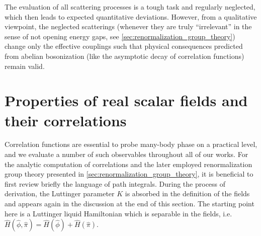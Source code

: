 The evaluation of all scattering processes is a tough task and regularly neglected, which then leads to expected quantitative deviations.
However, from a qualitative viewpoint, the neglected scatterings (whenever they are truly ``irrelevant'' in the sense of not opening energy gaps, see \cref{sec:renormalization_group_theory}) change only the effective couplings such that physical consequences predicted from abelian bosonization (like the asymptotic decay of correlation functions) remain valid.
%
%
\section{Properties of real scalar fields and their correlations}
\label{sec:properties_of_real_scalar_fields_and_their_correlations}
Correlation functions are essential to probe many-body phase on a practical level, and we evaluate a number of such observables throughout all of our works.
For the analytic computation of correlations and the later employed renormalization group theory presented in \cref{sec:renormalization_group_theory}, it is beneficial to first review briefly the language of path integrals.
During the process of derivation, the Luttinger parameter $K$ is absorbed in the definition of the fields and appears again in the discussion at the end of this section.
The starting point here is a Luttinger liquid Hamiltonian which is separable in the fields, i.e. $\hat H(\hat\phi,\hat\pi) = \hat H(\hat \phi) + \hat H(\hat \pi)$.

